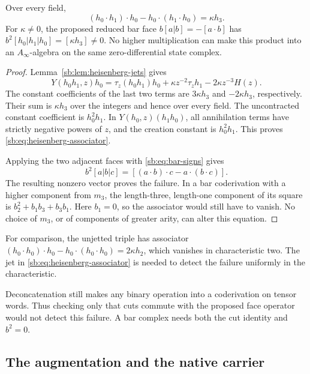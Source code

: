 \begin{theorem}
\label{sb:thm:heisenberg-associator}
Over every field,
\begin{equation}\label{sb:eq:heisenberg-associator}
 (h_0\cdot h_1)\cdot h_0-h_0\cdot(h_1\cdot h_0)
       =\kappa h_3.
\end{equation}
For \(\kappa\ne0\), the proposed reduced bar face
\(b[a|b]=-[a\cdot b]\) has
\(b^2[h_0|h_1|h_0]=[\kappa h_3]\ne0\).
No higher multiplication can make this product into an
\(A_\infty\)-algebra on the same zero-differential state complex.
\end{theorem}

\begin{proof}
Lemma~\ref{sb:lem:heisenberg-jets} gives
\[
 Y(h_0h_1,z)h_0
 =\tau_z(h_0h_1)h_0
  +\kappa z^{-2}\tau_z h_1-2\kappa z^{-3}H(z).
\]
The constant coefficients of the last two terms are
\(3\kappa h_3\) and \(-2\kappa h_3\), respectively.
Their sum is \(\kappa h_3\) over the integers and hence over
every field.  The uncontracted constant coefficient is \(h_0^2h_1\).
In \(Y(h_0,z)(h_1h_0)\), all annihilation terms have strictly
negative powers of \(z\), and the creation constant is
\(h_0^2h_1\).  This proves \eqref{sb:eq:heisenberg-associator}.

Applying the two adjacent faces with \eqref{sb:eq:bar-signs} gives
\[
 b^2[a|b|c]=[(a\cdot b)\cdot c-a\cdot(b\cdot c)].
\]
The resulting nonzero vector proves the failure.  In a bar coderivation
with a higher component from \(m_3\), the length-three,
length-one component of its square is
\(b_2^2+b_1b_3+b_3b_1\).  Here \(b_1=0\), so the associator
would still have to vanish.  No choice of \(m_3\), or of components
of greater arity, can alter this equation.
\end{proof}

For comparison, the unjetted triple has associator
\((h_0\cdot h_0)\cdot h_0-h_0\cdot(h_0\cdot h_0)
=2\kappa h_2\), which vanishes in characteristic two.
The jet in \eqref{sb:eq:heisenberg-associator} is needed to detect the
failure uniformly in the characteristic.

Deconcatenation still makes any binary operation into a coderivation
on tensor words.  Thus checking only that cuts commute with the proposed
face operator would not detect this failure.  A bar complex needs both
the cut identity and \(b^2=0\).

\subsection{The augmentation and the native carrier}

